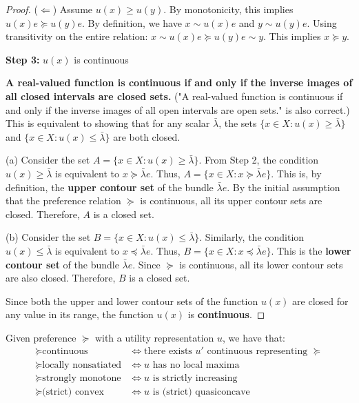 \begin{proof}
    ($\Longleftarrow$) Assume $u(x) \geq u(y)$.
    By monotonicity, this implies $u(x)e \succeq u(y)e$.
    By definition, we have $x \sim u(x)e$ and $y \sim u(y)e$.
    Using transitivity on the entire relation: $x \sim u(x)e \succeq u(y)e \sim y$. This implies $x \succeq y$.

    \textbf{Step 3:} $u(x)$ is continuous

    \textbf{A real-valued function is continuous if and only if the inverse images of all closed intervals are closed sets.} ("A real-valued function is continuous if and only if the inverse images of all open intervals are open sets." is also correct.) This is equivalent to showing that for any scalar $\bar{\lambda}$, the sets $\{x \in X : u(x) \geq \bar{\lambda}\}$ and $\{x \in X : u(x) \leq \bar{\lambda}\}$ are both closed.

    (a) Consider the set $A = \{x \in X : u(x) \geq \bar{\lambda}\}$. From Step 2, the condition $u(x) \geq \bar{\lambda}$ is equivalent to $x \succeq \bar{\lambda}e$. Thus, $A = \{x \in X : x \succeq \bar{\lambda}e\}$. This is, by definition, the \textbf{upper contour set} of the bundle $\bar{\lambda}e$. By the initial assumption that the preference relation $\succeq$ is continuous, all its upper contour sets are closed. Therefore, $A$ is a closed set.

    (b) Consider the set $B = \{x \in X : u(x) \leq \bar{\lambda}\}$. Similarly, the condition $u(x) \leq \bar{\lambda}$ is equivalent to $x \preceq \bar{\lambda}e$. Thus, $B = \{x \in X : x \preceq \bar{\lambda}e\}$. This is the \textbf{lower contour set} of the bundle $\bar{\lambda}e$. Since $\succeq$ is continuous, all its lower contour sets are also closed. Therefore, $B$ is a closed set.

    Since both the upper and lower contour sets of the function $u(x)$ are closed for any value in its range, the function $u(x)$ is \textbf{continuous}.
\end{proof}

\begin{proposition}
    Given preference $\succeq $ with a utility representation $u$, we have that: \begin{align*}
        \succeq \text{continuous}          & \iff \text{there exists $u'$ continuous representing $\succeq $} \\
        \succeq \text{locally nonsatiated} & \iff \text{$u$ has no local maxima}                              \\
        \succeq \text{strongly monotone}   & \iff \text{$u$ is strictly increasing}                           \\
        \succeq \text{(strict) convex}     & \iff \text{$u$ is (strict) quasiconcave}                         \\
    \end{align*}
\end{proposition}


